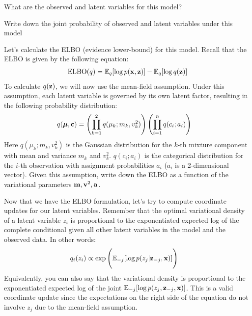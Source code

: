 \documentclass[11pt,addpoints,answers]{exam}
\numberwithin{equation}{section} %
\numberwithin{figure}{section} %
\numberwithin{table}{section} %
\begin{document}
\begin{questions}
\question[1] What are the observed and latent variables for this model?
\begin{tcolorbox}[fit,height=2cm, width=15cm, blank, borderline={1pt}{-2pt}]
\end{tcolorbox}

\question[1] Write down the joint probability of observed and latent variables under this model
\begin{tcolorbox}[fit,height=2cm, width=15cm, blank, borderline={1pt}{-2pt}]
\end{tcolorbox}

\question[3] Let's calculate the ELBO (evidence lower-bound) for this model. Recall that the ELBO is given by the following equation:
\begin{align*}
    \text{ELBO}(q) = \mathbb{E}_q[\log p(\mathbf{x}, \mathbf{z})] - \mathbb{E}_q[\log q(\mathbf{z})]
\end{align*}
To calculate $q(\mathbf{z})$, we will now use the mean-field assumption. Under this assumption, each latent variable is governed by its own latent factor, resulting in the following probability distribution:
\begin{align*}
    q(\boldsymbol \mu, \mathbf{c}) &= \left( \prod_{k=1}^2 q(\mu_k; m_k, v_k^2) \right) \left( \prod_{i=1}^n q(c_i; a_i) \right)
\end{align*}
Here $q(\mu_k; m_k, v_k^2)$ is the Gaussian distribution for the $k$-th mixture component with mean and variance $m_k$ and $v_k^2$. $q(c_i; a_i)$ is the categorical distribution for the $i$-th observation with assignment probabilities $a_i$ ($a_i$ is a 2-dimensional vector). Given this assumption, write down the ELBO as a function of the variational parameters $\mathbf{m}, \mathbf{v}^2, \mathbf{a}$.

\begin{tcolorbox}[fit,height=4cm, width=15cm, blank, borderline={1pt}{-2pt}]
\end{tcolorbox}

\question Now that we have the ELBO formulation, let's try to compute coordinate updates for our latent variables. Remember that the optimal variational density of a latent variable $z_i$ is proportional to the exponentiated expected log of the complete conditional given all other latent variables in the model and the observed data. In other words:
\begin{align*}
    q_i(z_i) &\propto \exp{\Bigg(\mathbb{E}_{-j}[\log p(z_j | \mathbf{z}_{-j}, \mathbf{x})]\Bigg)}
\end{align*}
Equivalently, you can also say that the variational density is proportional to the exponentiated expected log of the joint $\mathbb{E}_{-j}[\log p(z_j, \mathbf{z}_{-j}, \mathbf{x})]$. This is a valid coordinate update since the expectations on the right side of the equation do not involve $z_j$ due to the mean-field assumption. 
\begin{parts}

\end{parts}
\end{questions}
\end{document}
